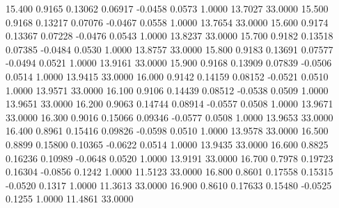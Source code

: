   15.400   0.9165   0.13062   0.06917  -0.0458   0.0573   1.0000  13.7027  33.0000
  15.500   0.9168   0.13217   0.07076  -0.0467   0.0558   1.0000  13.7654  33.0000
  15.600   0.9174   0.13367   0.07228  -0.0476   0.0543   1.0000  13.8237  33.0000
  15.700   0.9182   0.13518   0.07385  -0.0484   0.0530   1.0000  13.8757  33.0000
  15.800   0.9183   0.13691   0.07577  -0.0494   0.0521   1.0000  13.9161  33.0000
  15.900   0.9168   0.13909   0.07839  -0.0506   0.0514   1.0000  13.9415  33.0000
  16.000   0.9142   0.14159   0.08152  -0.0521   0.0510   1.0000  13.9571  33.0000
  16.100   0.9106   0.14439   0.08512  -0.0538   0.0509   1.0000  13.9651  33.0000
  16.200   0.9063   0.14744   0.08914  -0.0557   0.0508   1.0000  13.9671  33.0000
  16.300   0.9016   0.15066   0.09346  -0.0577   0.0508   1.0000  13.9653  33.0000
  16.400   0.8961   0.15416   0.09826  -0.0598   0.0510   1.0000  13.9578  33.0000
  16.500   0.8899   0.15800   0.10365  -0.0622   0.0514   1.0000  13.9435  33.0000
  16.600   0.8825   0.16236   0.10989  -0.0648   0.0520   1.0000  13.9191  33.0000
  16.700   0.7978   0.19723   0.16304  -0.0856   0.1242   1.0000  11.5123  33.0000
  16.800   0.8601   0.17558   0.15315  -0.0520   0.1317   1.0000  11.3613  33.0000
  16.900   0.8610   0.17633   0.15480  -0.0525   0.1255   1.0000  11.4861  33.0000
